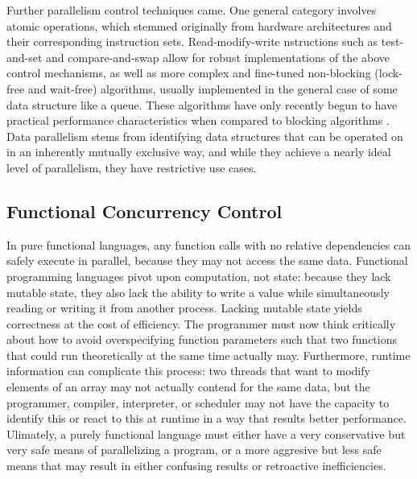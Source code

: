 Further parallelism control techniques came. One general category involves
atomic operations, which stemmed originally from hardware architectures and
their corresponding instruction sets. Read-modify-write nstructions such as
test-and-set and compare-and-swap allow for robust implementations of the above
control mechanisms, as well as more complex and fine-tuned non-blocking
(lock-free and wait-free) algorithms, usually implemented in the general case of
some data structure like a queue. These algorithms have only recently begun to
have practical performance characteristics when compared to blocking algorithms
\cite{waitfree_queue}. Data parallelism stems from identifying data structures
that can be operated on in an inherently mutually exclusive way, and while they
achieve a nearly ideal level of parallelism, they have restrictive use cases.

\subsection{Functional Concurrency Control}
In pure functional languages, any function calls with no relative dependencies
can safely execute in parallel, because they may not access the same data.
Functional programming languages pivot upon computation, not state: because they
lack mutable state, they also lack the ability to write a value while
simultaneously reading or writing it from another process. Lacking mutable state
yields correctness at the cost of efficiency. The programmer must now think
critically about how to avoid overspecifying function parameters such that two
functions that could run theoretically at the same time actually may.
Furthermore, runtime information can complicate this process: two threads that
want to modify elements of an array may not actually contend for the same data,
but the programmer, compiler, interpreter, or scheduler may not have the
capacity to identify this or react to this at runtime in a way that results
better performance. Ulimately, a purely functional language must either have a
very conservative but very safe means of parallelizing a program, or a more
aggresive but less safe means that may result in either confusing results or
retroactive inefficiencies.

